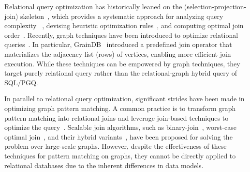 Relational query optimization has historically leaned on the \spj (selection-projection-join) skeleton~\cite{spj,Chaudhuri98}, which provides a systematic approach for analyzing query complexity~\cite{IbarakiK84,ChatterjiEGY02} , devising heuristic optimization rules~\cite{Chaudhuri99heuristics,goldsteinheuristics}, and
computing optimal join order~\cite{Haffnerjoinorder,chenjoinorder}. Recently, graph techniques have been introduced to optimize relational queries~\cite{wanderjoin,Haffnerjoinorder,gqfast,graindb}. %
In particular, GrainDB~\cite{graindb} introduced a predefined join operator that materializes the adjacency list (rows) of vertices, enabling more efficient join execution. While these techniques can be empowered by graph techniques, they target purely relational query rather than the relational-graph hybrid query of SQL/PGQ.

In parallel to relational query optimization, significant strides have been made in optimizing graph pattern matching. A common practice is to transform graph pattern matching into relational joins and leverage join-based techniques to optimize the query~\cite{lai2019distributed,lai2015scalable,ammar2018distributed,huge}. Scalable join algorithms, such as binary-join~\cite{lai2015scalable}, worst-case optimal join~\cite{ammar2018distributed}, and their hybrid variants~\cite{mhedhbi2019optimizing,huge,GLogS}, have been proposed for solving the problem over large-scale graphs. However, despite the effectiveness of these techniques for pattern matching on graphs, they cannot be directly applied to relational databases due to the inherent differences in data models.

